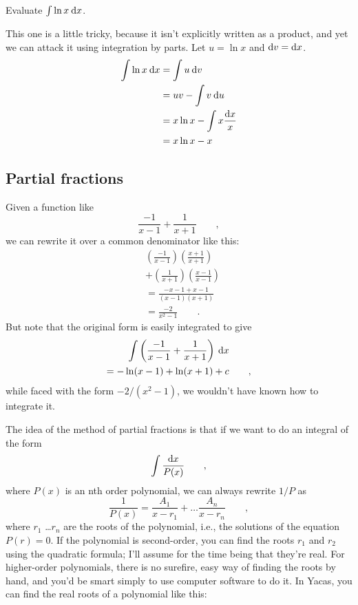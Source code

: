 \begin{eg}
\egquestion Evaluate $\int \ln x \:\textup{d} x$.

\eganswer This one is a little tricky, because it isn't explicitly
written as a product, and yet we can attack it using integration by
parts. Let $u=\ln x$ and $\textup{d} v=\textup{d} x$.
\begin{align*}
  \int \ln x \:\textup{d} x &= \int u \:\textup{d} v \\
                       &= uv - \int v \:\textup{d} u \\
                       &= x\ln x-\int x \frac{\textup{d} x}{x} \\
                       &= x\ln x-x
\end{align*}
\end{eg}

\subsection{Partial fractions}

Given a function like
\begin{equation*}
  \frac{-1}{x-1}+\frac{1}{x+1} \qquad ,
\end{equation*}
we can rewrite it over a common denominator like this:
\begin{align*}
  &\left(\frac{-1}{x-1}\right)\left(\frac{x+1}{x+1}\right) \\
  &+\left(\frac{1}{x+1}\right)\left(\frac{x-1}{x-1}\right) \\
  &=\frac{-x-1+x-1}{(x-1)(x+1)} \\
  &=\frac{-2}{x^2-1} \qquad .
\end{align*}
But note that the original form is easily integrated to give
\begin{multline*}
  \int \left(\frac{-1}{x-1}+\frac{1}{x+1}\right)\:\textup{d} x \\
    =-\ln(x-1)+\ln(x+1)+c \qquad ,
\end{multline*}
while faced with the form \linebreak[4] $-2/(x^2-1)$, we wouldn't have known how to
integrate it.

The idea of the method of partial fractions is that if we want to
do an integral of the form
\begin{equation*}
  \int \frac{\textup{d} x}{P(x)} \qquad ,
\end{equation*}
where $P(x)$ is an nth order polynomial, we can always rewrite $1/P$ as
\begin{equation*}
  \frac{1}{P(x)} = \frac{A_1}{x-r_1} + \ldots \frac{A_n}{x-r_n} \qquad ,
\end{equation*}
where $r_1$ \ldots $r_n$ are the roots of the polynomial, i.e., the
solutions of the equation $P(r)=0$. If the polynomial is second-order,
you can find the roots $r_1$ and $r_2$ using the quadratic formula; I'll assume for
the time being that they're real.
For higher-order polynomials, there is no surefire, easy
way of finding the roots by hand, and you'd be smart simply to use computer software
to do it. In Yacas, you can find the real roots of a polynomial like this:

